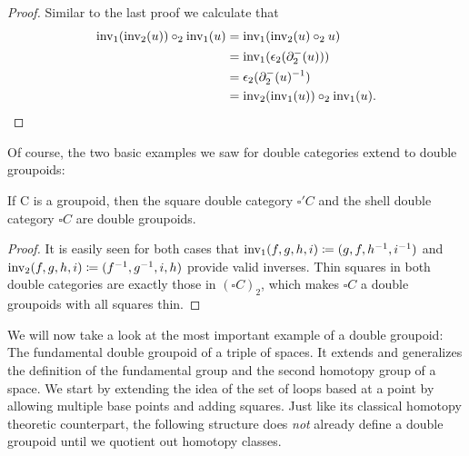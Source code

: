 \begin{proof}
Similar to the last proof we calculate that
\begin{align*}
\operatorname{inv_1}(\operatorname{inv_2}(u)) \circ_2 \operatorname{inv_1}(u)
	&= \operatorname{inv_1}(\operatorname{inv_2}(u) \circ_2 u) \\
	&= \operatorname{inv_1}(\epsilon_2(\partial^-_2(u))) \\
	&= \epsilon_2(\partial^-_2(u)^{-1}) \\
	&= \operatorname{inv_2}(\operatorname{inv_1}(u)) \circ_2 \operatorname{inv_1}(u) \text{.}
\end{align*}
\end{proof}

Of course, the two basic examples we saw for double categories extend to
double groupoids:
\begin{lemma} \label{thm:shell-dbl-gpd}
If C is a groupoid, then the square double category $\square' C$ and the
shell double category $\square C$ are double groupoids.
\end{lemma}

\begin{proof}
It is easily seen for both cases that $\operatorname{inv_1}(f, g, h, i) \coloneqq (g, f, h^{-1}, i^{-1})$
and $\operatorname{inv_2}(f, g, h, i) \coloneqq (f^{-1}, g^{-1}, i, h)$ provide valid inverses.
Thin squares in both double categories are exactly those in $(\square C)_2$,
which makes $\square C$ a double groupoids with all squares thin.
\end{proof}

We will now take a look at the most important example of a double groupoid:
The fundamental double groupoid of a triple of spaces. 
It extends and generalizes the definition of the fundamental group and the second
homotopy group of a space.
We start by extending the idea of the set of loops based at a point by allowing
multiple base points and adding squares.
Just like its classical homotopy theoretic counterpart,
the following structure does \emph{not} already define a double groupoid until we
quotient out homotopy classes.

